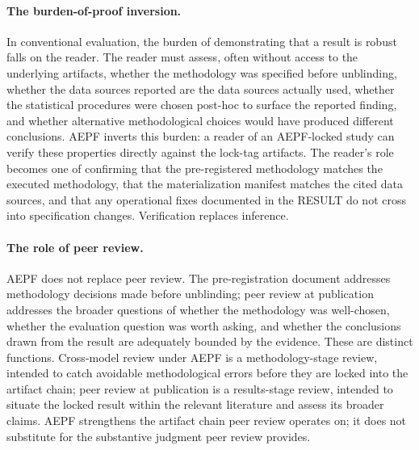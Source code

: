 \documentclass[11pt]{article}
\begin{document}
\paragraph{The burden-of-proof inversion.}
In conventional evaluation, the burden of demonstrating that a result
is robust falls on the reader. The reader must assess, often without
access to the underlying artifacts, whether the methodology was
specified before unblinding, whether the data sources reported are
the data sources actually used, whether the statistical procedures
were chosen post-hoc to surface the reported finding, and whether
alternative methodological choices would have produced different
conclusions. AEPF inverts this burden: a reader of an AEPF-locked
study can verify these properties directly against the lock-tag
artifacts. The reader's role becomes one of confirming that the
pre-registered methodology matches the executed methodology, that
the materialization manifest matches the cited data sources, and
that any operational fixes documented in the RESULT do not cross
into specification changes. Verification replaces inference.

\paragraph{The role of peer review.}
AEPF does not replace peer review. The pre-registration document
addresses methodology decisions made before unblinding; peer review
at publication addresses the broader questions of whether the
methodology was well-chosen, whether the evaluation question was
worth asking, and whether the conclusions drawn from the result are
adequately bounded by the evidence. These are distinct functions.
Cross-model review under AEPF is a methodology-stage review, intended
to catch avoidable methodological errors before they are locked into
the artifact chain; peer review at publication is a results-stage
review, intended to situate the locked result within the relevant
literature and assess its broader claims. AEPF strengthens the
artifact chain peer review operates on; it does not substitute for
the substantive judgment peer review provides.
\end{document}
